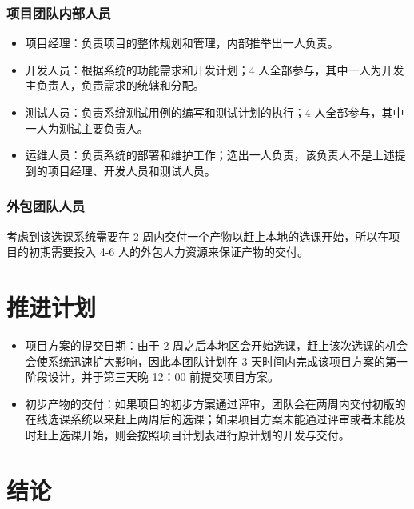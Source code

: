 \documentclass{article}
\begin{document}
\subsubsection{项目团队内部人员}
\begin{itemize}
	\item 项目经理：负责项目的整体规划和管理，内部推举出一人负责。
	\item 开发人员：根据系统的功能需求和开发计划；4 人全部参与，其中一人为开发主负责人，负责需求的统辖和分配。
	\item 测试人员：负责系统测试用例的编写和测试计划的执行；4 人全部参与，其中一人为测试主要负责人。
	\item 运维人员：负责系统的部署和维护工作；选出一人负责，该负责人不是上述提到的项目经理、开发人员和测试人员。
\end{itemize}

\subsubsection{外包团队人员}
考虑到该选课系统需要在 2 周内交付一个产物以赶上本地的选课开始，所以在项目的初期需要投入 4-6 人的外包人力资源来保证产物的交付。

\section{推进计划}
\begin{itemize}
	\item 项目方案的提交日期：由于 2 周之后本地区会开始选课，赶上该次选课的机会会使系统迅速扩大影响，因此本团队计划在 3 天时间内完成该项目方案的第一阶段设计，并于第三天晚 12：00 前提交项目方案。
	\item 初步产物的交付：如果项目的初步方案通过评审，团队会在两周内交付初版的在线选课系统以来赶上两周后的选课；如果项目方案未能通过评审或者未能及时赶上选课开始，则会按照项目计划表进行原计划的开发与交付。
\end{itemize}

\section{结论}
\end{document}
